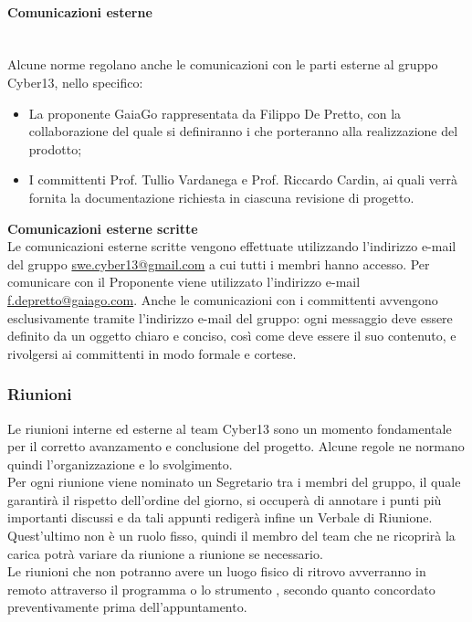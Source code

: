     \paragraph{Comunicazioni esterne}
    ~\\Alcune norme regolano anche le comunicazioni con le parti esterne al gruppo Cyber13, nello specifico:
    \begin{itemize}
    \item La proponente GaiaGo rappresentata da Filippo De Pretto, con la collaborazione del quale si definiranno i  che porteranno alla realizzazione del prodotto;
    \item I committenti Prof. Tullio Vardanega e Prof. Riccardo Cardin, ai quali verrà fornita la documentazione richiesta in ciascuna revisione di progetto. 
    \end{itemize}
    \textbf{Comunicazioni esterne scritte}
    ~\\ Le comunicazioni esterne scritte vengono effettuate utilizzando l'indirizzo e-mail del gruppo \url{swe.cyber13@gmail.com} a cui tutti i membri hanno accesso.
    Per comunicare con il Proponente viene utilizzato l'indirizzo e-mail \url{f.depretto@gaiago.com}.
    Anche le comunicazioni con i committenti avvengono esclusivamente tramite l'indirizzo e-mail del gruppo: ogni messaggio deve essere definito da un oggetto chiaro e conciso, così come deve essere il suo contenuto, e rivolgersi ai committenti in modo formale e cortese.
    
\subsubsection{Riunioni}
Le riunioni interne ed esterne al team Cyber13 sono un momento fondamentale per il corretto avanzamento e conclusione del progetto. Alcune regole ne normano quindi l'organizzazione e lo svolgimento.
\\Per ogni riunione viene nominato un Segretario tra i membri del gruppo, il quale garantirà il rispetto dell'ordine del giorno, si occuperà di annotare i punti più importanti discussi e da tali appunti redigerà infine un Verbale di Riunione. Quest'ultimo non è un ruolo fisso, quindi il membro del team che ne ricoprirà la carica potrà variare da riunione a riunione se necessario.
\\Le riunioni che non potranno avere un luogo fisico di ritrovo avverranno in remoto attraverso il programma  o lo strumento , secondo quanto concordato preventivamente prima dell'appuntamento.

